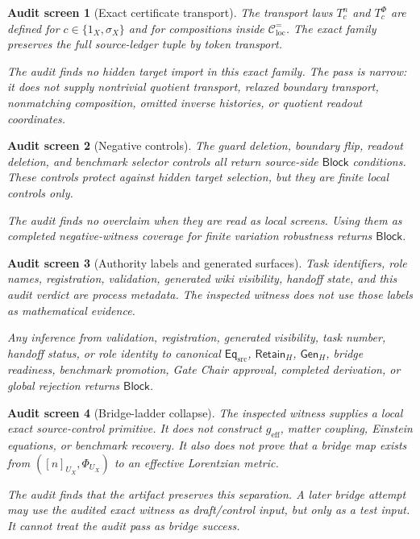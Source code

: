 \documentclass[11pt]{article}
\newcommand{\EqSrc}{\mathsf{Eq}_{\mathrm{src}}}
\newcommand{\RetainH}{\mathsf{Retain}_{H}}
\newcommand{\GenH}{\mathsf{Gen}_{H}}
\newcommand{\geff}{g_{\mathrm{eff}}}
\newcommand{\Block}{\mathsf{Block}}
\newtheorem{screen}{Audit screen}
\begin{document}
\begin{screen}[Exact certificate transport]
The transport laws \(T_c^n\) and \(T_c^\Phi\) are defined for
\(c\in\{1_X,\sigma_X\}\) and for compositions inside
\(\mathcal{C}^{=}_{\mathrm{loc}}\). The exact family preserves the
full source-ledger tuple by token transport.

The audit finds no hidden target import in this exact family. The
pass is narrow: it does not supply nontrivial quotient transport,
relaxed boundary transport, nonmatching composition, omitted inverse
histories, or quotient readout coordinates.
\end{screen}

\begin{screen}[Negative controls]
The guard deletion, boundary flip, readout deletion, and benchmark
selector controls all return source-side \(\Block\) conditions. These
controls protect against hidden target selection, but they are finite
local controls only.

The audit finds no overclaim when they are read as local screens.
Using them as completed negative-witness coverage for finite
variation robustness returns \(\Block\).
\end{screen}

\begin{screen}[Authority labels and generated surfaces]
Task identifiers, role names, registration, validation, generated wiki
visibility, handoff state, and this audit verdict are process
metadata. The inspected witness does not use those labels as
mathematical evidence.

Any inference from validation, registration, generated visibility,
task number, handoff status, or role identity to canonical
\(\EqSrc\), \(\RetainH\), \(\GenH\), bridge readiness, benchmark
promotion, Gate Chair approval, completed derivation, or global
rejection returns \(\Block\).
\end{screen}

\begin{screen}[Bridge-ladder collapse]
The inspected witness supplies a local exact source-control primitive.
It does not construct \(\geff\), matter coupling, Einstein equations,
or benchmark recovery. It also does not prove that a bridge map exists
from \(([n]_{U_X},\Phi_{U_X})\) to an effective Lorentzian metric.

The audit finds that the artifact preserves this separation. A later
bridge attempt may use the audited exact witness as draft/control
input, but only as a test input. It cannot treat the audit pass as
bridge success.
\end{screen}
\end{document}
